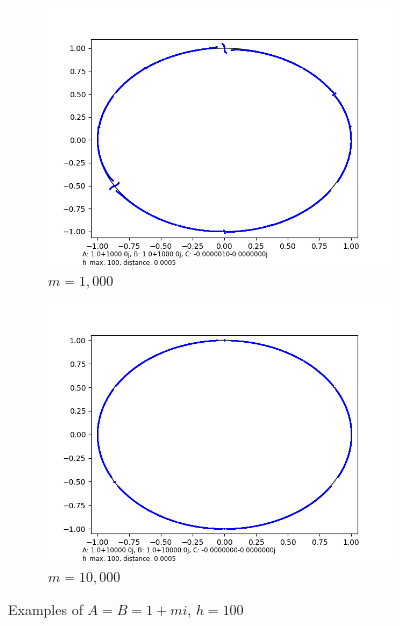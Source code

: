 \documentclass[12pt,a4paper,reqno,parskip=full]{amsart}
\numberwithin{equation}{section}
\theoremstyle{plain}
\theoremstyle{definition}
\begin{document}
\begin{figure}[H]
\begin{subfigure}[b]{0.3\textwidth}
         \centering
         \includegraphics[width=\textwidth]{images/m/a1000,b1000,h100,d.0005.png}
         \caption{$m=1,000$}
         \label{fig:m1,000}
     \end{subfigure}
     \hfill
     \begin{subfigure}[b]{0.3\textwidth}
         \centering
         \includegraphics[width=\textwidth]{images/m/a10,000,b10,000,h100,d.0005.png}
         \caption{$m=10,000$}
         \label{fig:m10,000}
     \end{subfigure}
     
        \caption{Examples of $A=B=1+mi$, $h=100$}
        \label{fig:m}
\end{figure}
\end{document}
